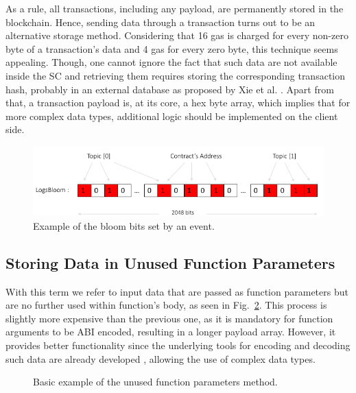 As a rule, all transactions, including any payload, are permanently stored in the blockchain. Hence, sending data through a transaction turns out to be an alternative storage method. Considering that 16 gas is charged for every non-zero byte of a transaction’s data and 4 gas for every zero byte, this technique seems appealing. Though, one cannot ignore the fact that such data are not available inside the SC and retrieving them requires storing the corresponding transaction hash, probably in an external database as proposed by Xie et al. \citep{xie_2017}. Apart from that, a transaction payload is, at its core, a hex byte array, which implies that for more complex data types, additional logic should be implemented on the client side.

\begin{figure}[htbp]
\centerline{\includegraphics[width=\textwidth]{figs/bloom.pdf}}
\caption{Example of the bloom bits set by an event.}
\label{fig: bloom}
\end{figure}

\subsection{Storing Data in Unused Function Parameters}\label{subsection:}
With this term we refer to input data that are passed as function parameters but are no further used within function’s body, as seen in Fig.~\ref{fig:un}. This process is slightly more expensive than the previous one, as it is mandatory for function arguments to be ABI encoded, resulting in a longer payload array. However, it provides better functionality since the underlying tools for encoding and decoding such data are already developed  \citep{web3}, allowing the use of complex data types.

\begin{figure}[htbp]
\setlength{\fboxsep}{5pt}%
\setlength{\fboxrule}{0.05pt}%
\centerline{}
\caption{Basic example of the unused function parameters method.}
\label{fig:un}
\end{figure}

